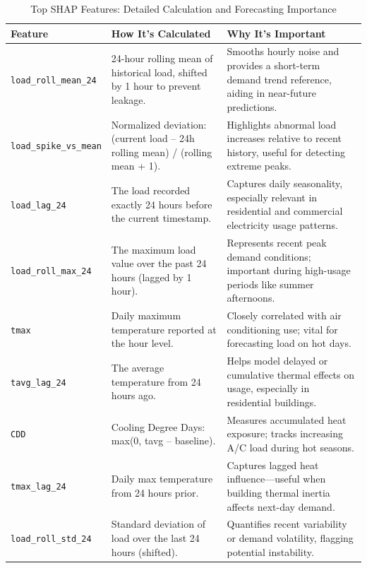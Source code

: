 \documentclass{ifacconf}
\begin{document}
\clearpage
\begin{table}[p]
\centering
\small
\centering
\small
\caption{Top SHAP Features: Detailed Calculation and Forecasting Importance}

\begin{adjustbox}{width=\textwidth}
\begin{tabular}{|p{4cm}|p{6cm}|p{6cm}|}
\hline
\textbf{Feature} & \textbf{How It's Calculated} & \textbf{Why It's Important} \\
\hline
\texttt{load\_roll\_mean\_24} & 24-hour rolling mean of historical load, shifted by 1 hour to prevent leakage. & Smooths hourly noise and provides a short-term demand trend reference, aiding in near-future predictions. \\
\hline
\texttt{load\_spike\_vs\_mean} & Normalized deviation: (current load – 24h rolling mean) / (rolling mean + 1). & Highlights abnormal load increases relative to recent history, useful for detecting extreme peaks. \\
\hline
\texttt{load\_lag\_24} & The load recorded exactly 24 hours before the current timestamp. & Captures daily seasonality, especially relevant in residential and commercial electricity usage patterns. \\
\hline
\texttt{load\_roll\_max\_24} & The maximum load value over the past 24 hours (lagged by 1 hour). & Represents recent peak demand conditions; important during high-usage periods like summer afternoons. \\
\hline
\texttt{tmax} & Daily maximum temperature reported at the hour level. & Closely correlated with air conditioning use; vital for forecasting load on hot days. \\
\hline
\texttt{tavg\_lag\_24} & The average temperature from 24 hours ago. & Helps model delayed or cumulative thermal effects on usage, especially in residential buildings. \\
\hline
\texttt{CDD} & Cooling Degree Days: max(0, tavg – baseline). & Measures accumulated heat exposure; tracks increasing A/C load during hot seasons. \\
\hline
\texttt{tmax\_lag\_24} & Daily max temperature from 24 hours prior. & Captures lagged heat influence—useful when building thermal inertia affects next-day demand. \\
\hline
\texttt{load\_roll\_std\_24} & Standard deviation of load over the last 24 hours (shifted). & Quantifies recent variability or demand volatility, flagging potential instability. \\
\hline

\end{tabular}
\end{adjustbox}
\end{table}
\end{document}
